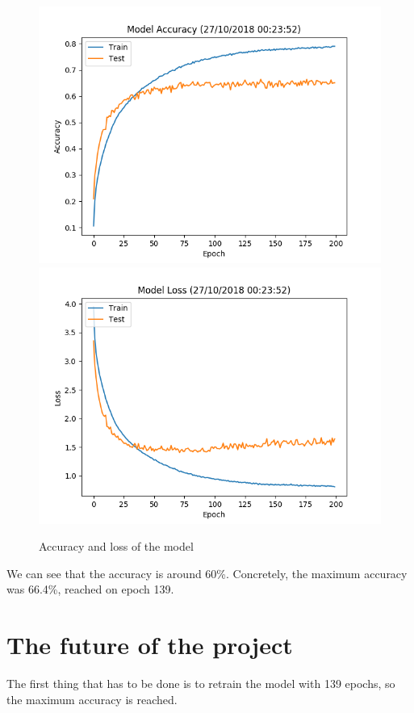\documentclass[12pt,spanish]{article}
\begin{document}
\begin{figure}[H]
\centering
\includegraphics[scale=0.85]{accuracy.png}
\includegraphics[scale=0.85]{loss.png}
\caption{Accuracy and loss of the model}
\end{figure}

We can see that the accuracy is around 60\%. Concretely, the maximum accuracy was 66.4\%, reached on epoch 139.\\

\section{The future of the project}

The first thing that has to be done is to retrain the model with 139 epochs, so the maximum accuracy is reached.\\
\end{document}
